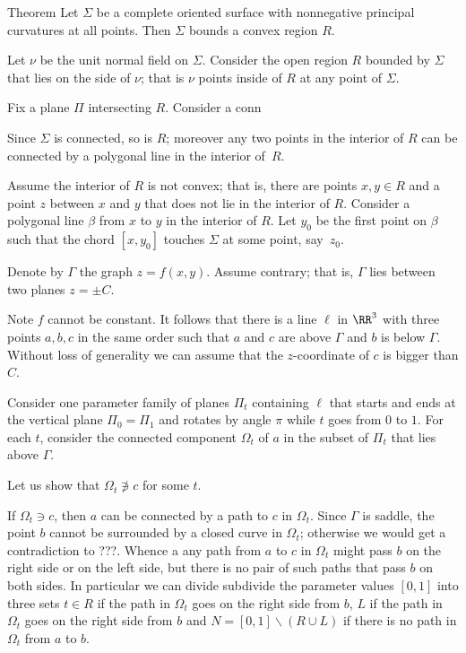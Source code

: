 \begin{thm}{Theorem}
Let $\Sigma$ be a complete oriented surface with 
nonnegative principal curvatures at all points.
Then $\Sigma$ bounds a convex region $R$.
\end{thm}

Let $\nu$ be the unit normal field on $\Sigma$.
Consider the open region $R$ bounded by $\Sigma$ that lies on the side of $\nu$;
that is $\nu$ points inside of $R$ at any point of $\Sigma$.

Fix a plane $\Pi$ intersecting $R$.
Consider a conn

Since $\Sigma$ is connected, so is $R$;
moreover any two points in the interior of $R$ can be connected by a polygonal line in the interior of~$R$.

Assume the interior of $R$ is not convex; that is, there are points $x,y\in R$ and a point $z$ between $x$ and $y$ that does not lie in the interior of $R$.
Consider a polygonal  line $\beta$ from $x$ to $y$ in the interior of $R$.
Let $y_0$ be the first point on $\beta$ such that the chord $[x,y_0]$ touches $\Sigma$ at some point, say~$z_0$.

\qeds












Denote by $\Gamma$ the graph $z=f(x,y)$.
Assume contrary; that is, $\Gamma$ lies between two planes $z=\pm C$.

Note $f$ cannot be constant.
It follows that there is a line $\ell$ in $\RR^3$ with three points $a,b,c$ in the same order such that 
$a$ and $c$ are above $\Gamma$ and $b$ is below $\Gamma$.
Without loss of generality we can assume that the $z$-coordinate of $c$ is bigger than $C$.

Consider one parameter family of planes $\Pi_t$ containing $\ell$ that starts and ends at the vertical plane $\Pi_0=\Pi_1$ and rotates by angle $\pi$ while $t$ goes from $0$ to $1$.
For each $t$, consider the connected component $\Omega_t$ of $a$ in the subset of $\Pi_t$ that lies above $\Gamma$.

Let us show that $\Omega_t\not\ni c$ for some $t$.

If  $\Omega_t\ni c$, then $a$ can be connected by a path to $c$ in $\Omega_t$.
Since $\Gamma$ is saddle, the point $b$ cannot be surrounded by a closed curve in $\Omega_t$;
otherwise we would get a contradiction to ???.
Whence a any path from $a$ to $c$ in $\Omega_t$ might pass $b$ on the right side or on the left side,
but there is no pair of such paths that pass $b$ on both sides.
In particular we can divide subdivide the parameter values $[0,1]$ into three sets $t\in R$ if the path  in $\Omega_t$  goes on the right side from $b$,  $L$ if the path in $\Omega_t$ goes on the right side from $b$ and $N=[0,1]\backslash(R\cup L)$ if there is no path in $\Omega_t$ from $a$ to $b$.

